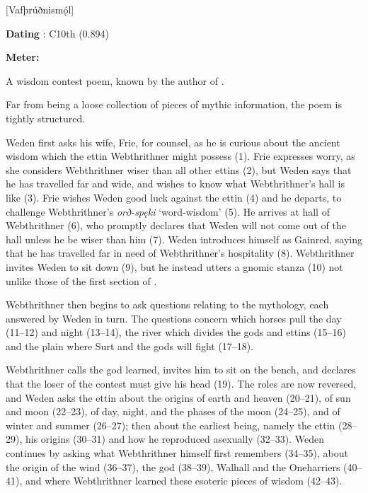 [Vafþrúðnismǫ́l]

\begin{flushright}%
\textbf{Dating} \parencite{Sapp2022}: C10th (0.894)

\textbf{Meter:} \Ljodahattr%
\end{flushright}%

A wisdom contest poem, known by the author of \Gylfaginning.

Far from being a loose collection of pieces of mythic information, the poem is tightly structured.

Weden first asks his wife, Frie, for counsel, as he is curious about the ancient wisdom which the ettin Webthrithner might possess (1). Frie expresses worry, as she considers Webthrithner wiser than all other ettins (2), but Weden says that he has travelled far and wide, and wishes to know what Webthrithner’s hall is like (3). Frie wishes Weden good luck against the ettin (4) and he departs, to challenge Webthrithner’s \emph{orð-spęki} ‘word-wisdom’ (5). He arrives at hall of Webthrithner (6), who promptly declares that Weden will not come out of the hall unless he be wiser than him (7). Weden introduces himself as Gainred, saying that he has travelled far in need of Webthrithner’s hospitality (8). Webthrithner invites Weden to sit down (9), but he instead utters a gnomic stanza (10) not unlike those of the first section of \Havamal.

Webthrithner then begins to ask questions relating to the mythology, each answered by Weden in turn. The questions concern which horses pull the day (11–12) and night (13–14), the river which divides the gods and ettins (15–16) and the plain where Surt and the gods will fight (17–18).

Webthrithner calls the god learned, invites him to sit on the bench, and declares that the loser of the contest must give his head (19). The roles are now reversed, and Weden asks the ettin about the origins of earth and heaven (20–21), of sun and moon (22–23), of day, night, and the phases of the moon (24–25), and of winter and summer (26–27); then about the earliest being, namely the ettin  (28–29), his origins (30–31) and how he reproduced asexually (32–33). Weden continues by asking what Webthrithner himself first remembers (34–35), about the origin of the wind (36–37), the god  (38–39), Walhall and the Oneharriers (40–41), and where Webthrithner learned these esoteric pieces of wisdom (42–43).

